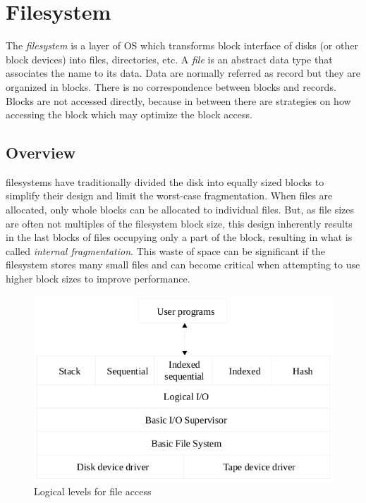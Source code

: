 \chapter{Filesystem}
The \emph{filesystem} is a layer of OS which transforms block interface of disks (or other block devices) into files, directories, etc.
A \emph{file} is an abstract data type that associates the name to its data. Data are normally referred as record but they are organized in blocks. There is no correspondence between blocks and records. Blocks are not accessed directly, because in between there are strategies on how accessing the block which may optimize the block access.

\section{Overview}
filesystems have traditionally divided the disk into equally sized blocks to simplify their design and limit the worst-case fragmentation. When files are allocated, only whole blocks can be allocated to individual files. But, as file sizes are often not multiples of the filesystem block size, this design inherently results in the last blocks of files  occupying only a part of the block, resulting in what is called \emph{internal fragmentation}. This waste of space can be significant if the filesystem stores many small files and can become critical when attempting to use higher block sizes to improve performance.

\begin{figure}[hbtp]
\centering
\includegraphics[scale=0.4]{images/file_system/logical_level_file_access.png}
\caption{Logical levels for file access}
\end{figure}

